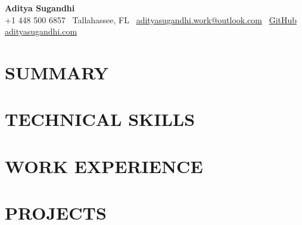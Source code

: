 \documentclass[letterpaper,10pt]{article}
\newcommand{\resumeItem}[1]{\item\small #1}
\newcommand{\resumeSubheading}[4]{
  \vspace{6pt}
  \noindent
  \textbf{#1} \hfill {\footnotesize #2} \\
  [-1pt]
  \noindent
  \small #3 \hfill {\small #4}
  \vspace{3pt}
}
\newcommand{\resumeItemsStart}{\vspace{-2pt}\begin{itemize}}
\newcommand{\resumeItemsEnd}{\end{itemize}\vspace{6pt}}
\begin{document}
\begin{center}
{\huge\textbf{Aditya Sugandhi}} \\
+1 448 500 6857 \textbar\ \textcolor{metablue}{Tallahassee, FL} \textbar\
\href{mailto:adityasugandhi.work@outlook.com}{adityasugandhi.work@outlook.com} \textbar\
\href{https://github.com/adityasugandhi}{GitHub}
\textbar \href{https://adityasugandhi.com}{adityasugandhi.com}
\end{center}
\vspace{-12pt}

\section{\textcolor{metablue}{SUMMARY}}
\small
\vspace{-6pt}

\vspace{-9pt}

\section{\textcolor{metablue}{TECHNICAL SKILLS}}
\vspace{-5pt}
\small
\begin{itemize}
\end{itemize}
\vspace{-10pt}


\section{\textcolor{metablue}{WORK EXPERIENCE}}
\vspace{-12pt}


\vspace{-8pt}


\section{\textcolor{metablue}{PROJECTS}}
\vspace{-5pt}
\begin{tcolorbox}[colback=white,colframe=metablue,boxrule=0.8pt,arc=2pt,left=4pt,right=4pt,top=2pt,bottom=2pt]
\begin{itemize}
\end{itemize}
\end{tcolorbox}
\vspace{-5pt}
\end{document}
